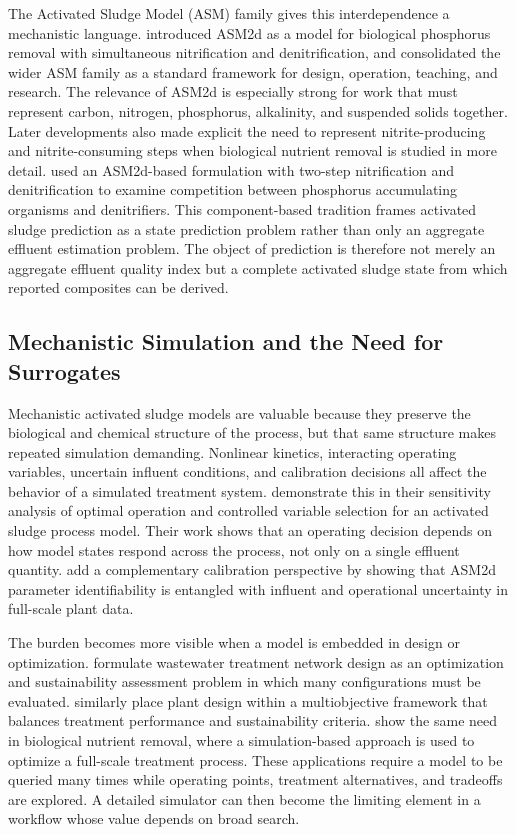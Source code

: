 \documentclass[12pt, twoside]{book}
\begin{document}
The Activated Sludge Model (ASM) family gives this interdependence a mechanistic language. \citet{Henze1999}
introduced ASM2d as a model for biological phosphorus removal with simultaneous nitrification and
denitrification, and \citet{Henze2006} consolidated the wider ASM family as a standard framework for design,
operation, teaching, and research. The relevance of ASM2d is especially strong for work that must represent
carbon, nitrogen, phosphorus, alkalinity, and suspended solids together. Later developments also made explicit
the need to represent nitrite-producing and nitrite-consuming steps when biological nutrient removal is studied
in more detail. \citet{Guerrero2011} used an ASM2d-based formulation with two-step nitrification and
denitrification to examine competition between phosphorus accumulating organisms and denitrifiers. This
component-based tradition frames activated sludge prediction as a state prediction problem rather than only an
aggregate effluent estimation problem. The object of prediction is therefore not merely an aggregate effluent
quality index but a complete activated sludge state from which reported
composites can be derived.

\subsection{Mechanistic Simulation and the Need for Surrogates}

Mechanistic activated sludge models are valuable because they preserve the biological and chemical structure of
the process, but that same structure makes repeated simulation demanding. Nonlinear kinetics, interacting
operating variables, uncertain influent conditions, and calibration decisions all affect the behavior of a
simulated treatment system. \citet{Araujo2013} demonstrate this in their sensitivity analysis of optimal
operation and controlled variable selection for an activated sludge process model. Their work shows that an
operating decision depends on how model states respond across the process, not only on a single effluent
quantity. \citet{Machado2014} add a complementary calibration perspective by showing that ASM2d parameter
identifiability is entangled with influent and operational uncertainty in full-scale plant data.

The burden becomes more visible when a model is embedded in design or optimization. \citet{Aboagye2021}
formulate wastewater treatment network design as an optimization and sustainability assessment problem in
which many configurations must be evaluated. \citet{PadronPaez2020} similarly place plant design within a
multiobjective framework that balances treatment performance and sustainability criteria. \citet{Fang2011}
show the same need in biological nutrient removal, where a simulation-based approach is used to optimize a
full-scale treatment process. These applications require a model to be queried many times while operating
points, treatment alternatives, and tradeoffs are explored. A detailed simulator can then become the limiting
element in a workflow whose value depends on broad search.
\end{document}
